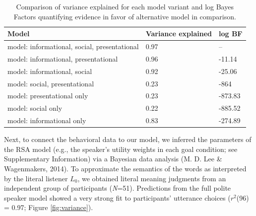 \documentclass[floatsintext,mask,man]{apa6}
\theoremstyle{definition}
\theoremstyle{definition}
\theoremstyle{definition}
\theoremstyle{remark}
\begin{document}
\begin{table}[tbp]
\begin{center}
\begin{threeparttable}
\caption{\label{tab:comparisonTable}Comparison of variance explained for each model variant and log Bayes Factors quantifying evidence in favor of alternative model in comparison.}
\begin{tabular}{lll}
\toprule
Model & \multicolumn{1}{c}{Variance 
explained} & \multicolumn{1}{c}{log BF}\\
\midrule
model: 
informational, 
social, 
presentational & 0.97 & --\\
model: 
informational, 
presentational & 0.96 & -11.14\\
model: 
informational, 
social & 0.92 & -25.06\\
model: 
social, 
presentational & 0.23 & -864\\
model: 
presentational 
only & 0.23 & -873.83\\
model: 
social only & 0.22 & -885.52\\
model: 
informational 
only & 0.83 & -274.89\\
\bottomrule
\end{tabular}
\end{threeparttable}
\end{center}
\end{table}

Next, to connect the behavioral data to our model, we inferred the
parameters of the RSA model (e.g., the speaker's utility weights in each
goal condition; see Supplementary Information) via a Bayesian data
analysis (M. D. Lee \& Wagenmakers, 2014). To approximate the semantics
of the words as interpreted by the literal listener \(L_0\), we obtained
literal meaning judgments from an independent group of participants
(\emph{N}=51). Predictions from the full polite speaker model showed a
very strong fit to participants' utterance choices (\(r^2\)(96) = 0.97;
Figure \ref{fig:variance}).
\end{document}
